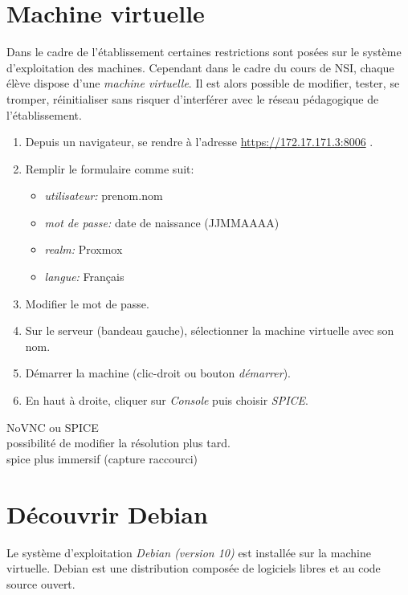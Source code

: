 \documentclass[a4paper,11pt]{article}
\begin{document}
\section{Machine virtuelle}
Dans le cadre de l'établissement certaines restrictions sont posées sur le système d'exploitation des machines. Cependant dans le cadre du cours de NSI, chaque élève dispose d'une \emph{machine virtuelle}. Il est alors possible de modifier, tester, se tromper, réinitialiser sans risquer d'interférer avec le réseau pédagogique de l'établissement.
\begin{activite}
    \begin{enumerate}
        \item Depuis un navigateur, se rendre à l'adresse \url{https://172.17.171.3:8006} .
        \item Remplir le formulaire comme suit:
              \begin{itemize}
                  \item \emph{utilisateur:} prenom.nom
                  \item \emph{mot de passe:} date de naissance (JJMMAAAA)
                  \item \emph{realm:} Proxmox
                  \item \emph{langue:} Français
              \end{itemize}
        \item Modifier le mot de passe.
        \item Sur le serveur (bandeau gauche), sélectionner la machine virtuelle avec son nom.
        \item Démarrer la machine (clic-droit ou bouton \emph{démarrer}).
        \item En haut à droite, cliquer sur \emph{Console} puis choisir \emph{SPICE}.
    \end{enumerate}
\end{activite}
\begin{commentprof}
NoVNC ou SPICE\\ possibilité de modifier la résolution plus tard.\\ spice plus immersif (capture raccourci)
\end{commentprof}
\section{Découvrir Debian}
Le système d'exploitation \emph{Debian (version 10)} est installée sur la machine virtuelle. Debian est une distribution composée de logiciels libres et au code source ouvert.
\end{document}
